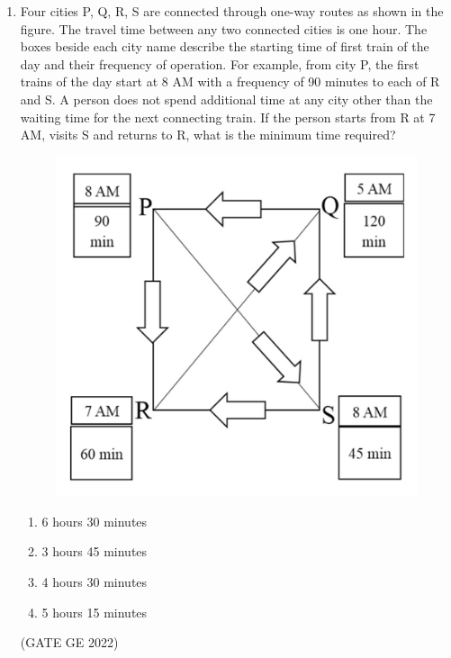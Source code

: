 \documentclass[a4paper, 11pt]{article}
\begin{document}
\begin{enumerate}
\item Four cities P, Q, R, S are connected through one-way routes as shown in the figure. The travel time between any two connected cities is one hour. The boxes beside each city name describe the starting time of first train of the day and their frequency of operation. For example, from city P, the first trains of the day start at 8 AM with a frequency of 90 minutes to each of R and S. A person does not spend additional time at any city other than the waiting time for the next connecting train.
If the person starts from R at 7 AM, visits S and returns to R, what is the minimum time required?
\begin{figure}[H]
    \centering
    \includegraphics[width=\columnwidth]{figs/fig_9.png}
    \label{fig:placeholder}
\end{figure}
\begin{enumerate}
    \item 6 hours 30 minutes
    \item 3 hours 45 minutes
    \item 4 hours 30 minutes
    \item 5 hours 15 minutes
\end{enumerate}

\hfill (GATE GE 2022)


\end{enumerate}
\end{document}
